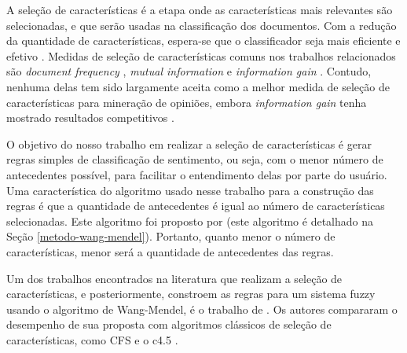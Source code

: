 \documentclass[template.tex]{subfiles}
\begin{document}

A seleção de características é a etapa onde as características mais relevantes são selecionadas, e que serão usadas na classificação dos documentos. Com a redução da quantidade de características, espera-se que o classificador seja mais eficiente e efetivo \cite{moraes2012document}. Medidas de seleção de características comuns nos trabalhos relacionados são \textit{document frequency} \cite{pang2002thumbs}, \textit{mutual information} \cite{turney2002thumbs} e \textit{information gain} \cite{wiebe2006word}. Contudo, nenhuma delas tem sido largamente aceita como a melhor medida de seleção de características para mineração de opiniões, embora \textit{information gain} tenha mostrado resultados competitivos \cite{moraes2012document}.

O objetivo do nosso trabalho em realizar a seleção de características é gerar regras simples de classificação de sentimento, ou seja, com o menor número de antecedentes possível, para facilitar o entendimento delas por parte do usuário. Uma característica do algoritmo usado nesse trabalho para a construção das regras é que a quantidade de antecedentes é igual ao número de características selecionadas. Este algoritmo foi proposto por  (este algoritmo é detalhado na Seção \ref{metodo-wang-mendel}). Portanto, quanto menor o número de características, menor será a quantidade de antecedentes das regras.

Um dos trabalhos encontrados na literatura que realizam a seleção de características, e posteriormente, constroem as regras para um sistema fuzzy usando o algoritmo de Wang-Mendel, é o trabalho de . Os autores compararam o desempenho de sua proposta com algoritmos clássicos de seleção de características, como CFS \cite{hall1999correlation} e o c4.5 \cite{quinlan2014c4}. 
\end{document}

